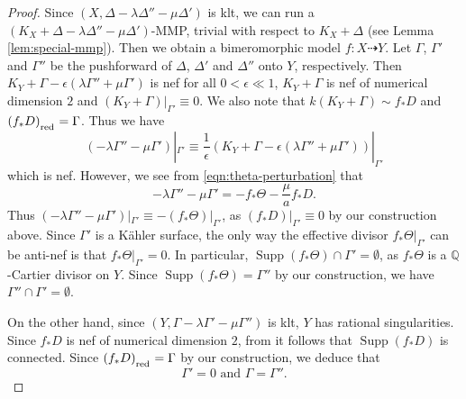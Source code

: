 \documentclass[12pt]{amsart}
\newcommand{\mbQ}{\mathbb{Q}}
\newcommand{\<}{\leq}
\def\eps{\epsilon}
\newcommand{\num}{\equiv}
\newcommand{\bir}{\dashrightarrow}
\newcommand{\D}{\Delta}
\theoremstyle{remark}
\theoremstyle{definition}
\theoremstyle{definition}
\numberwithin{equation}{section}
\theoremstyle{definition}
\theoremstyle{definition}
\def\Supp{\operatorname{Supp}}
\def\red{\operatorname{\textsubscript{\rm red}}}
\begin{document}
\begin{proof}
Since $(X, \D - \lambda \D'' - \mu \D')$ is klt, we can run a $(K_X+\Delta - \lambda \D'' - \mu \D')$-MMP, trivial with respect to $K_X+\Delta$  (see Lemma  \ref{lem:special-mmp}).  
Then we  obtain a bimeromorphic model  $f\colon  X\dashrightarrow Y$. 
Let $\Gamma$, $\Gamma'$ and $\Gamma''$ be the pushforward of $\Delta$, $\Delta'$ and $\Delta''$ onto $Y$, respectively. 
Then $K_Y+\Gamma - \epsilon (\lambda\Gamma''+\mu\Gamma')$ is nef for all $0<\eps\ll 1$, $K_Y+\Gamma$ is nef of numerical dimension $2$  and  $(K_Y+\Gamma)|_{\Gamma'}\num 0$. We also note that  $k(K_Y+\Gamma) \sim f_*D$ and $(f_*D)_{\red} = \Gamma$. Thus we have
\[
(- \lambda\Gamma'' - \mu\Gamma')|_{\Gamma'}\num \frac{1}{\eps}(K_Y+\Gamma-\eps(\lambda\Gamma''+\mu\Gamma'))|_{\Gamma'}
\]
which is nef. 
However, we see from \eqref{eqn:theta-perturbation} that 
\[
- \lambda\Gamma'' - \mu\Gamma' = - f_*\Theta - \frac{\mu}{a} f_*D.
\]
Thus $(- \lambda\Gamma'' - \mu\Gamma')|_{\Gamma'} \equiv - (f_*\Theta)|_{\Gamma'}$, as $(f_*D)|_{\Gamma'} \equiv 0$ by our construction above.  Since $\Gamma'$ is a K\"ahler surface, the only way the effective divisor $f_*\Theta|_{\Gamma'}$ can be anti-nef is that $f_*\Theta|_{\Gamma'}=0$. 
In particular, $\Supp(f_*\Theta)\cap\Gamma'=\emptyset$, as $f_*\Theta$ is a $\mbQ$-Cartier divisor on $Y$. Since $\Supp(f_*\Theta)=\Gamma''$ by our construction, we have $\Gamma''\cap\Gamma'= \emptyset$. 


On the other hand, since $(Y,\Gamma - \lambda\Gamma'-\mu\Gamma'')$ is klt, $Y$ has rational singularities. 
Since $f_*D$ is nef of numerical dimension $2$, from \cite[Lemma 6.7]{CHP16} it follows that $\Supp(f_*D)$ is connected. 
Since $(f_*D)_{\red}=\Gamma$ by our construction, we deduce  that
  \[\Gamma' = 0  \mbox{ and }  \Gamma = \Gamma''.\]




\end{proof}
\end{document}
